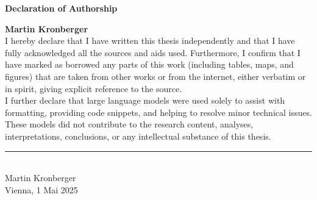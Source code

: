 \vspace*{1cm} %
\begin{center}
    {\LARGE \bfseries Declaration of Authorship}\\[1cm]
\end{center}
\vspace{1cm} %

{\bfseries \noindent Martin Kronberger}\\[0.5cm]

\noindent I hereby declare that I have written this thesis independently and that I have fully acknowledged all the sources and aids used.
Furthermore, I confirm that I have marked as borrowed any parts of this work (including tables, maps, and figures) that are taken from other works or from the internet, either verbatim or in spirit, giving explicit reference to the source.
\\[0.3cm]

\noindent
I further declare that large language models were used solely to assist with formatting, providing code snippets, and helping to resolve minor technical issues.
These models did not contribute to the research content, analyses, interpretations, conclusions, or any intellectual substance of this thesis.

\vfill 

\begin{minipage}[t]{0.5\textwidth}
    \rule[0pt]{6cm}{0.5pt}\\
    Martin Kronberger\\
    Vienna, 1 Mai 2025
\end{minipage}

\vspace{\fill}
\blankpage
